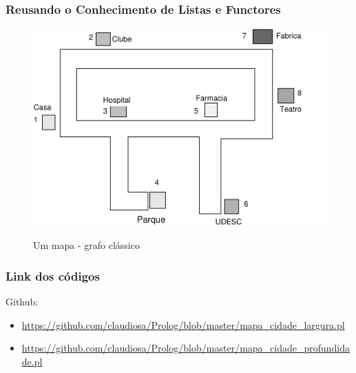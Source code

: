 \documentclass[sans]{beamer}
\begin{document}

\begin{frame}
\frametitle{Reusando o Conhecimento de Listas e Functores}

\begin{figure}[!htb]
\centering
\includegraphics[scale=0.5]{figuras/grafo_mapa.pdf}
\label{fig_grafo_mapa}
\caption{Um mapa - grafo clássico}
\end{figure}


\end{frame}


\begin{frame}[fragile]   %
\frametitle{Link dos códigos}
\begin{block}{Github:}
\begin{itemize}

  \item \url{https://github.com/claudiosa/Prolog/blob/master/mapa_cidade_largura.pl}
  \item \url{https://github.com/claudiosa/Prolog/blob/master/mapa_cidade_profundidade.pl}

\end{itemize}  
\end{block}   
\end{frame}

\end{document}
